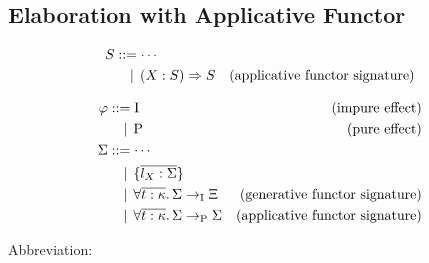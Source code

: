 \subsection{Elaboration with Applicative Functor}

\begin{align*}
  S
  &\BNFassign \cdots \\
  &\BNFor (X: S) \Rightarrow S &(\text{applicative functor signature})
\end{align*}

\newcommand*{\symP}{\mathrm{P}}
\newcommand*{\symI}{\mathrm{I}}

\begin{align*}
  \varphi
  &\BNFassign \symI &(\text{impure effect}) \\
  &\BNFor \symP &(\text{pure effect}) \\
  \Sigma
  &\BNFassign \cdots \\
  &\BNFor \{\overline{l_X: \Sigma}\} \\
  &\BNFor \forall \overline{t: \kappa}\ldotp \Sigma \to_\symI \Xi &(\text{generative functor signature}) \\
  &\BNFor \forall \overline{t: \kappa}\ldotp \Sigma \to_\symP \Sigma &(\text{applicative functor signature})
\end{align*}

Abbreviation:

